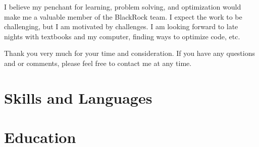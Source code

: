 \documentclass[11pt,a4paper,sans]{moderncv} %
\begin{document}
I believe my penchant for learning, problem solving, and optimization would make me a valuable member of the BlackRock team. I expect the work to be challenging, but I am motivated by challenges. I am looking forward to late nights with textbooks and my computer, finding ways to optimize code, etc.

Thank you very much for your time and consideration. If you have any questions and or comments, please feel free to contact me at any time.

\makeletterclosing %

\clearpage



\makecvtitle %

\section{Skills and Languages}


\section{Education}
\end{document}
